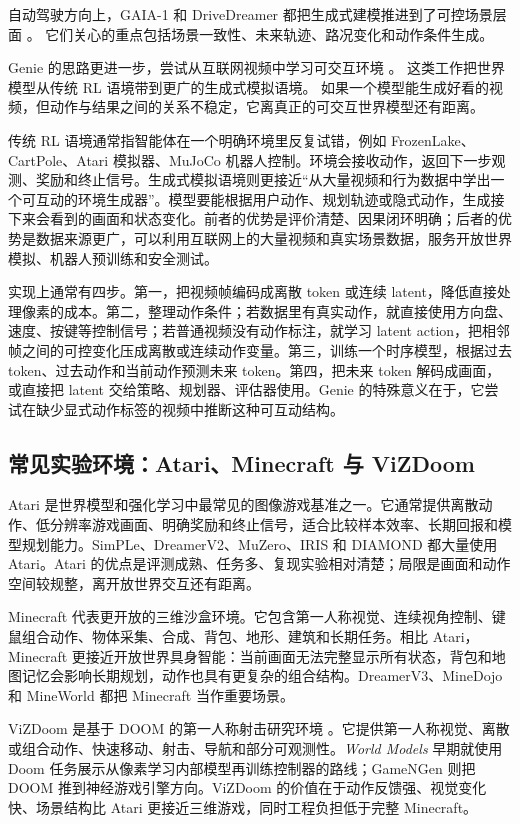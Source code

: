 \documentclass[11pt,a4paper]{ctexart}
\begin{document}
自动驾驶方向上，GAIA-1 和 DriveDreamer 都把生成式建模推进到了可控场景层面 \cite{hu2023gaia,wang2023drivedreamer}。
它们关心的重点包括场景一致性、未来轨迹、路况变化和动作条件生成。

Genie 的思路更进一步，尝试从互联网视频中学习可交互环境 \cite{bruce2024genie}。
这类工作把世界模型从传统 RL 语境带到更广的生成式模拟语境。
如果一个模型能生成好看的视频，但动作与结果之间的关系不稳定，它离真正的可交互世界模型还有距离。

传统 RL 语境通常指智能体在一个明确环境里反复试错，例如 FrozenLake、CartPole、Atari 模拟器、MuJoCo 机器人控制。环境会接收动作，返回下一步观测、奖励和终止信号。生成式模拟语境则更接近“从大量视频和行为数据中学出一个可互动的环境生成器”。模型要能根据用户动作、规划轨迹或隐式动作，生成接下来会看到的画面和状态变化。前者的优势是评价清楚、因果闭环明确；后者的优势是数据来源更广，可以利用互联网上的大量视频和真实场景数据，服务开放世界模拟、机器人预训练和安全测试。

实现上通常有四步。第一，把视频帧编码成离散 token 或连续 latent，降低直接处理像素的成本。第二，整理动作条件；若数据里有真实动作，就直接使用方向盘、速度、按键等控制信号；若普通视频没有动作标注，就学习 latent action，把相邻帧之间的可控变化压成离散或连续动作变量。第三，训练一个时序模型，根据过去 token、过去动作和当前动作预测未来 token。第四，把未来 token 解码成画面，或直接把 latent 交给策略、规划器、评估器使用。Genie 的特殊意义在于，它尝试在缺少显式动作标签的视频中推断这种可互动结构。

\subsection{常见实验环境：Atari、Minecraft 与 ViZDoom}

Atari 是世界模型和强化学习中最常见的图像游戏基准之一。它通常提供离散动作、低分辨率游戏画面、明确奖励和终止信号，适合比较样本效率、长期回报和模型规划能力。SimPLe、DreamerV2、MuZero、IRIS 和 DIAMOND 都大量使用 Atari。Atari 的优点是评测成熟、任务多、复现实验相对清楚；局限是画面和动作空间较规整，离开放世界交互还有距离。

Minecraft 代表更开放的三维沙盒环境。它包含第一人称视觉、连续视角控制、键鼠组合动作、物体采集、合成、背包、地形、建筑和长期任务。相比 Atari，Minecraft 更接近开放世界具身智能：当前画面无法完整显示所有状态，背包和地图记忆会影响长期规划，动作也具有更复杂的组合结构。DreamerV3、MineDojo 和 MineWorld 都把 Minecraft 当作重要场景。

ViZDoom 是基于 DOOM 的第一人称射击研究环境 \cite{kempka2016vizdoom}。它提供第一人称视觉、离散或组合动作、快速移动、射击、导航和部分可观测性。\emph{World Models} 早期就使用 Doom 任务展示从像素学习内部模型再训练控制器的路线；GameNGen 则把 DOOM 推到神经游戏引擎方向。ViZDoom 的价值在于动作反馈强、视觉变化快、场景结构比 Atari 更接近三维游戏，同时工程负担低于完整 Minecraft。
\end{document}
